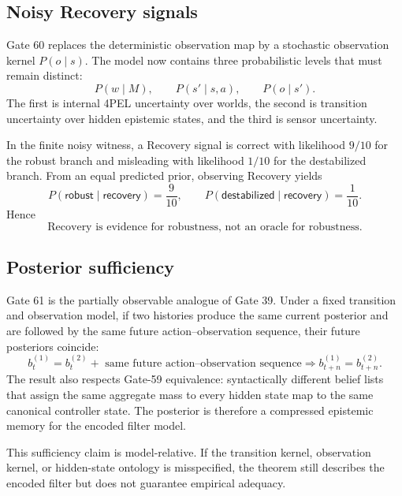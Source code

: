 \subsection{Noisy Recovery signals}

Gate 60 replaces the deterministic observation map by a stochastic observation kernel $P(o\mid s)$. The model now contains three probabilistic levels that must remain distinct:
\[
P(w\mid M),
\qquad
P(s'\mid s,a),
\qquad
P(o\mid s').
\]
The first is internal 4PEL uncertainty over worlds, the second is transition uncertainty over hidden epistemic states, and the third is sensor uncertainty.

In the finite noisy witness, a Recovery signal is correct with likelihood $9/10$ for the robust branch and misleading with likelihood $1/10$ for the destabilized branch. From an equal predicted prior, observing Recovery yields
\[
P(\textsf{robust}\mid\textsf{recovery})=\frac9{10},
\qquad
P(\textsf{destabilized}\mid\textsf{recovery})=\frac1{10}.
\]
Hence
\[
\boxed{\text{Recovery is evidence for robustness, not an oracle for robustness.}}
\]

\subsection{Posterior sufficiency}

Gate 61 is the partially observable analogue of Gate 39. Under a fixed transition and observation model, if two histories produce the same current posterior and are followed by the same future action--observation sequence, their future posteriors coincide:
\[
\boxed{
 b_t^{(1)}=b_t^{(2)}
 +\text{ same future action--observation sequence}
 \Longrightarrow
 b_{t+n}^{(1)}=b_{t+n}^{(2)}.
}
\]
The result also respects Gate-59 equivalence: syntactically different belief lists that assign the same aggregate mass to every hidden state map to the same canonical controller state. The posterior is therefore a compressed epistemic memory for the encoded filter model.

This sufficiency claim is model-relative. If the transition kernel, observation kernel, or hidden-state ontology is misspecified, the theorem still describes the encoded filter but does not guarantee empirical adequacy.

